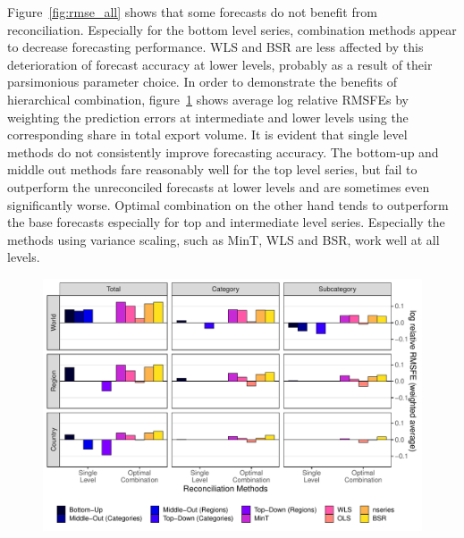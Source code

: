\documentclass[a4paper,fleqn,11pt]{article}
\begin{document}
Figure~\ref{fig:rmse_all} shows that some forecasts do not benefit from reconciliation. Especially for the bottom level series, combination methods appear to decrease forecasting performance. WLS and BSR are less affected by this deterioration of forecast accuracy at lower levels, probably as a result of their parsimonious parameter choice. In order to demonstrate the benefits of hierarchical combination, figure~\ref{fig:rmse} shows average log relative RMSFEs by weighting the prediction errors at intermediate and lower levels using the corresponding share in total export volume. It is evident that single level methods do not consistently improve forecasting accuracy. The bottom-up and middle out methods fare reasonably well for the top level series, but fail to outperform the unreconciled forecasts at lower levels and are sometimes even significantly worse. Optimal combination on the other hand tends to outperform the base forecasts especially for top and intermediate level series. Especially the methods using variance scaling, such as MinT, WLS and BSR, work well at all levels.

\begin{figure}[H]
	\includegraphics[width=\textwidth]{fig/fig_eval_rmse_relative}
	\label{fig:rmse}
\end{figure}
\end{document}
